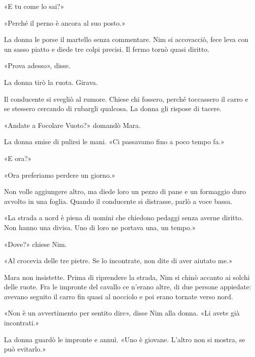 \documentclass[10pt,a4paper]{article}
\begin{document}
«E tu come lo sai?»

«Perché il perno è ancora al suo posto.»

La donna le porse il martello senza commentare. Nim si accovacciò, fece leva con un sasso piatto e diede tre colpi precisi. Il fermo tornò quasi diritto.

«Prova adesso», disse.

La donna tirò la ruota. Girava.

Il conducente si svegliò al rumore. Chiese chi fossero, perché toccassero il carro e se stessero cercando di rubargli qualcosa. La donna gli rispose di tacere.

«Andate a Focolare Vuoto?» domandò Mara.

La donna smise di pulirsi le mani. «Ci passavamo fino a poco tempo fa.»

«E ora?»

«Ora preferiamo perdere un giorno.»

Non volle aggiungere altro, ma diede loro un pezzo di pane e un formaggio duro avvolto in una foglia. Quando il conducente si distrasse, parlò a voce bassa.

«La strada a nord è piena di uomini che chiedono pedaggi senza averne diritto. Non hanno una divisa. Uno di loro ne portava una, un tempo.»

«Dove?» chiese Nim.

«Al crocevia delle tre pietre. Se lo incontrate, non dite di aver aiutato me.»

Mara non insistette. Prima di riprendere la strada, Nim si chinò accanto ai solchi delle ruote. Fra le impronte del cavallo ce n'erano altre, di due persone appiedate: avevano seguito il carro fin quasi al nocciolo e poi erano tornate verso nord.

«Non è un avvertimento per sentito dire», disse Nim alla donna. «Li avete già incontrati.»

La donna guardò le impronte e annuì. «Uno è giovane. L'altro non si mostra, se può evitarlo.»
\end{document}
